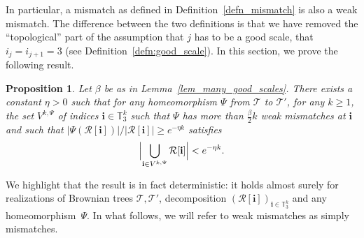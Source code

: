\documentclass[JEP,XML,SOM,Unicode,NoFloatCountersInSection,published]{cedram}
\newcommand{\bsfrac}[2]{{#1}\big/{#2}}
\newcommand{\Tt}{\mathcal{T}}
\newcommand{\Rr}{\mathcal{R}}
\newcommand{\ii}{\mathbf{i}}
\theoremstyle{plain}
\newtheorem{proposition}[theorem]{Proposition}
\theoremstyle{definition}
\begin{document}
In particular, a mismatch as defined in Definition~\ref{defn_mismatch} is also a weak mismatch.
The difference between the two definitions is that we have removed the ``topological'' part of the assumption that $j$ has to be a good scale, \ie that $i_j=i_{j+1}=3$ (see Definition~\ref{defn:good_scale}).
In this section, we prove the following result.
\begin{proposition}\label{prop:mass of bad regions is small}
Let $\beta$ be as in Lemma~\ref{lem_many_good_scales}.
There exists a constant $\eta>0$ such that for any homeomorphism $\Psi$ from $\Tt$ to $\Tt'$, for any $k\geq 1$, the set $V^{k,\Psi}$ of indices $\ii \in \mathbb{T}_3^k$ such that $\Psi$ has more than $\frac{\beta}{2} k$ weak mismatches at $\ii$ and such that $\bsfrac{\left| \Psi \left( \Rr[\ii] \right) \right|}{\left| \Rr[\ii] \right|} \geq e^{-\eta k}$ satisfies\vspace*{-3pt}
\begin{align*}
\Bigl|\bigcup_{\ii \in V^{k,\Psi}}\Rr[\ii]\Bigr| < e^{-\eta k}.
\end{align*}
\end{proposition}
We highlight that the result is in fact deterministic: it holds almost surely for realizations of Brownian trees $\Tt, \Tt'$, decomposition $(\Rr[\ii])_{\ii\in \mathbb{T}_3^k}$ and any homeomorphism~$\Psi$.
In what follows, we will refer to weak mismatches as simply mismatches.
\end{document}

